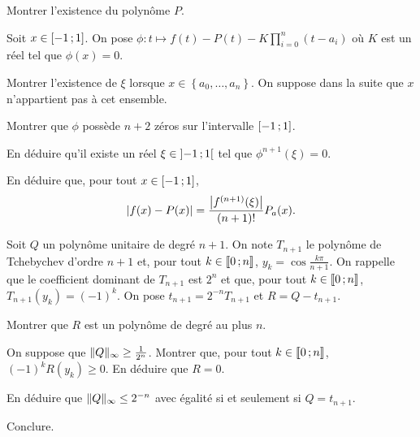 \begin{exercice}
\begin{questions}
\item Montrer l'existence du polynôme $P$.
\end{questions}

Soit $x \in \left[-1\,;1\right]$. On pose $\phi : t \mapsto f(t) - P(t) - K \prod_{i=0}^n (t - a_i)$ où $K$ est un réel tel que $\phi(x) = 0$.

\begin{questions}[resume]
\item Montrer l'existence de $\xi$ lorsque $x \in \left\{a_0,\ldots,a_n\right\}$. On suppose dans la suite que $x$ n'appartient pas à cet ensemble.

\item Montrer que $\phi$ possède $n + 2$ zéros sur l'intervalle $\left[-1\,;1\right]$.

\item En déduire qu'il existe un réel $\xi \in \left]-1\,;1\right[$ tel que $\phi^{n+1}(\xi) = 0$.

\item En déduire que, pour tout $x \in \left[-1\,;1\right]$,
\[
\left| f(x) - P(x) \right| = \frac{\left| f^{(n+1)}(\xi) \right|}{(n+1)!} P_a(x).
\]
\end{questions}

Soit $Q$ un polynôme unitaire de degré $n+1$. On note $T_{n+1}$ le polynôme de Tchebychev d'ordre $n + 1$ et, pour tout $k \in \llbracket 0\,; n \rrbracket$, $y_k = \cos \frac{k\pi}{n+1}$. On rappelle que le coefficient dominant de $T_{n+1}$ est $2^n$ et que, pour tout $k \in \llbracket 0\,; n \rrbracket$, $T_{n+1}(y_k) = (-1)^k$. On pose $t_{n+1} = 2^{-n} T_{n+1}$ et $R = Q - t_{n+1}$.
\begin{questions}[resume]
\item Montrer que $R$ est un polynôme de degré au plus $n$.

\item On suppose que $\Vert Q \Vert_\infty \geq \frac{1}{2^n}$. Montrer que, pour tout $k \in \llbracket 0\,; n \rrbracket$, $(-1)^k R(y_k) \geq 0$. En déduire que $R = 0$.

\item En déduire que $\Vert Q \Vert_\infty \leq 2^{-n}$ avec égalité si et seulement si $Q = t_{n+1}$.

\item Conclure.
\end{questions}
\end{exercice}

